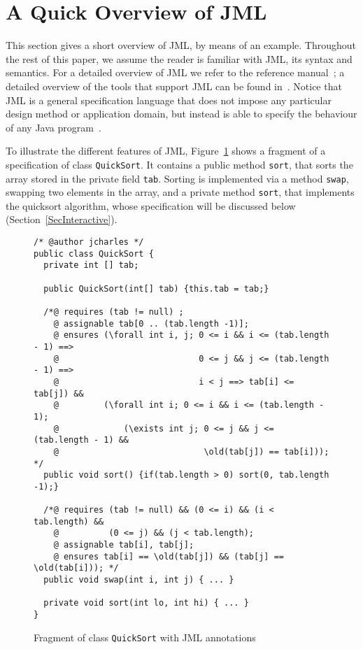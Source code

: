\section{A Quick Overview of JML}\label{SecJML}



This section gives a short overview of JML, by means of an
example. Throughout the rest of this paper, we assume the reader is
familiar with JML, its syntax and semantics. For a detailed overview
of JML we refer to the reference manual~\cite{LeavensPCCRCK05}; a
detailed overview of the tools that support JML can be found
in~\cite{BurdyCCEKLLP03}.  Notice that JML is a general specification
language that does not impose any particular design method or
application domain, but instead is able to specify the behaviour of
any Java program~\cite{LeavensBR06}.



To illustrate the different features of JML, Figure~\ref{FigJMLSpec}
shows a fragment of a specification of class
\texttt{QuickSort}. It contains a public method
\texttt{sort}, that sorts the array stored in the private field
\texttt{tab}. Sorting is implemented via  a method \texttt{swap},
swapping two elements in the array, and a private method
\texttt{sort}, that implements the quicksort algorithm, whose
specification will be discussed below (Section~\ref{SecInteractive}).

\begin{figure}[t!]
{\small
\begin{verbatim}
/* @author jcharles */
public class QuickSort {
  private int [] tab;

  public QuickSort(int[] tab) {this.tab = tab;}

  /*@ requires (tab != null) ;
    @ assignable tab[0 .. (tab.length -1)];
    @ ensures (\forall int i, j; 0 <= i && i <= (tab.length - 1) ==> 
    @                            0 <= j && j <= (tab.length - 1) ==>
    @                            i < j ==> tab[i] <= tab[j]) &&
    @         (\forall int i; 0 <= i && i <= (tab.length - 1); 
    @             (\exists int j; 0 <= j && j <= (tab.length - 1) && 
    @                             \old(tab[j]) == tab[i])); */
  public void sort() {if(tab.length > 0) sort(0, tab.length -1);}

  /*@ requires (tab != null) && (0 <= i) && (i < tab.length) && 
    @          (0 <= j) && (j < tab.length);
    @ assignable tab[i], tab[j];
    @ ensures tab[i] == \old(tab[j]) && (tab[j] == \old(tab[i])); */
  public void swap(int i, int j) { ... }

  private void sort(int lo, int hi) { ... }
}
\end{verbatim}
}
\vspace*{-1em}\caption{Fragment of class \texttt{QuickSort} with JML annotations} 
\label{FigJMLSpec}
\end{figure}



